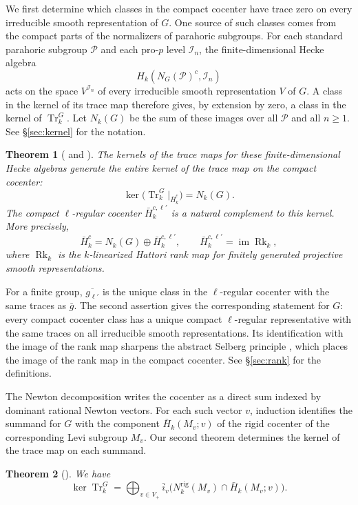 \documentclass[11pt,letterpaper]{amsart}
\newtheorem{theoremintro}{Theorem}
\theoremstyle{definition}
\numberwithin{equation}{section}
\numberwithin{theorem}{section}
\let\ge\geqslant
\newcommand{\kk}{k}
\newcommand{\CI}{\mathcal I}
\newcommand{\rig}{\mathrm{rig}}
\DeclareMathOperator{\Tr}{Tr}
\DeclareMathOperator{\Rk}{Rk}
\DeclareMathOperator{\im}{im}
\begin{document}
We first determine which classes in the compact cocenter
have trace zero on every irreducible smooth representation
of $G$. One source of such classes comes from the compact
parts of the normalizers of parahoric subgroups. For each
standard parahoric subgroup $\mathcal P$ and each pro-$p$
level $\CI_n$, the finite-dimensional Hecke algebra
\[
 H_\kk(N_G(\mathcal P)^c,\CI_n)
\]
acts on the space $V^{\CI_n}$ of every irreducible smooth
representation $V$ of $G$. A class in the kernel of its
trace map therefore gives, by extension by zero, a class
in the kernel of $\Tr_\kk^G$. Let $N_\kk(G)$ be the sum
of these images over all $\mathcal P$ and all $n\ge1$.
See \S\ref{sec:kernel} for the notation.

\begin{theoremintro}[{ and
                      }]
\label{thm:intro-compact}
\label{thm:intro-rank}
The kernels of the trace maps for these finite-dimensional
Hecke algebras generate the entire kernel of the trace map
on the compact cocenter:
\[
 \ker\bigl(\Tr_\kk^G|_{\bar H_\kk^c}\bigr)=N_\kk(G).
\]
The compact $\ell$-regular cocenter $\bar H_\kk^{c,\ell'}$
is a natural complement to this kernel. More precisely,
\[
 \bar H_\kk^c=N_\kk(G)\oplus\bar H_\kk^{c,\ell'},
 \qquad
 \bar H_\kk^{c,\ell'}=\im\Rk_\kk,
\]
where $\Rk_\kk$ is the $\kk$-linearized Hattori rank map
for finitely generated projective smooth representations.
\end{theoremintro}

For a finite group, $\overline{g_{\ell'}}$ is the unique
class in the $\ell$-regular cocenter with the same traces
as $\bar g$. The second assertion gives the corresponding
statement for $G$: every compact cocenter class has a unique
compact $\ell$-regular representative with the same traces
on all irreducible smooth representations. Its identification
with the image of the rank map sharpens the abstract Selberg
principle \cite[Theorem~7.1]{CHIII}, which places the image
of the rank map in the compact cocenter. See
\S\ref{sec:rank} for the definitions.

The Newton decomposition \cite{HeI,HeII} writes the cocenter as a direct sum indexed by dominant rational Newton vectors. For each such vector $v$, induction identifies the summand for $G$ with the component
$\bar H_\kk(M_v;v)$ of the rigid cocenter of the corresponding Levi subgroup $M_v$. Our second theorem determines the kernel of the trace map on each summand.

\begin{theoremintro}[{}]
\label{thm:intro-whole}
We have
\[
 \ker\Tr_\kk^G
   =\bigoplus_{v\in V_+}
      \bar i_v\bigl(
        N_\kk^{\rig}(M_v)\cap\bar H_\kk(M_v;v)
      \bigr).
\]
\end{theoremintro}
\end{document}
